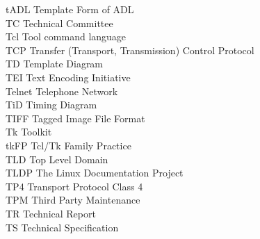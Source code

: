 \begin{tabbing}
    \>tADL \>\>Template Form of ADL\\

    \>TC \>\>Technical Committee\\



    \>Tcl \>\>Tool command language\\


    \>TCP \>\>Transfer (Transport, Transmission) Control Protocol\\

    \>TD \>\>Template Diagram\\

    \>TEI \>\>Text Encoding Initiative\\

    \>Telnet \>\>Telephone Network\\


    \>TiD \>\>Timing Diagram\\

    \>TIFF \>\>Tagged Image File Format\\

    \>Tk \>\>Toolkit\\

    \>tkFP \>\>Tcl/Tk Family Practice\\

    \>TLD \>\>Top Level Domain\\

    \>TLDP \>\>The Linux Documentation Project\\


    \>TP4 \>\>Transport Protocol Class 4\\

    \>TPM \>\>Third Party Maintenance\\

    \>TR \>\>Technical Report\\

    \>TS \>\>Technical Specification\\


\end{tabbing}
